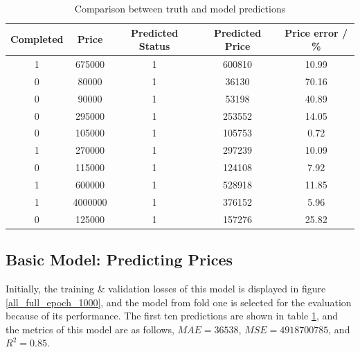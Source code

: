 \documentclass[12pt,twoside]{report}
\begin{document}
\begin{table}[!htbp]
	\centering
	\caption{Comparison between truth and model predictions}
	\label{first_model_predictions}
	\begin{tabular}{| c | c | c | c | c |}
		\hline
		Completed & Price & Predicted Status & Predicted Price & Price error  / \%\\ 
		\hline
		1 & 675000 & 1 & 600810 & 10.99 \\
		\hline
		0 & 80000 & 1 & 36130 & 70.16 \\
		\hline
		0 & 90000 & 1 & 53198 & 40.89  \\
		\hline
		0 & 295000 & 1 & 253552 & 14.05  \\
		\hline
		0 & 105000 & 1 & 105753 & 0.72  \\ 
		\hline
		1 & 270000 & 1 & 297239 & 10.09  \\
		\hline
		0 & 115000 & 1 & 124108 & 7.92  \\
		\hline
		1 & 600000 & 1 & 528918 & 11.85  \\
		\hline
		1 & 4000000 & 1 & 376152 & 5.96  \\
		\hline
		0 & 125000 & 1 & 157276 & 25.82  \\
		\hline
	\end{tabular}
\end{table}

\subsection{Basic Model: Predicting Prices}
Initially, the training \& validation losses of this model is displayed in figure \ref{all_full_epoch_1000}, and the model from fold one is selected for the evaluation because of its performance. The first ten predictions are shown in table \ref{first_model_predictions}, and the metrics of this model are as follows, $MAE = 36538$, $MSE = 4918700785$, and $R^2 = 0.85$. 
\end{document}
